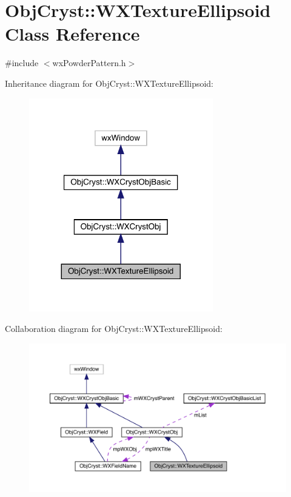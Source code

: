 \hypertarget{class_obj_cryst_1_1_w_x_texture_ellipsoid}{}\section{Obj\+Cryst\+::W\+X\+Texture\+Ellipsoid Class Reference}
\label{class_obj_cryst_1_1_w_x_texture_ellipsoid}


{\ttfamily \#include $<$wx\+Powder\+Pattern.\+h$>$}



Inheritance diagram for Obj\+Cryst\+::W\+X\+Texture\+Ellipsoid\+:
\nopagebreak
\begin{figure}[H]
\begin{center}
\leavevmode
\includegraphics[width=227pt]{class_obj_cryst_1_1_w_x_texture_ellipsoid__inherit__graph}
\end{center}
\end{figure}


Collaboration diagram for Obj\+Cryst\+::W\+X\+Texture\+Ellipsoid\+:
\nopagebreak
\begin{figure}[H]
\begin{center}
\leavevmode
\includegraphics[width=350pt]{class_obj_cryst_1_1_w_x_texture_ellipsoid__coll__graph}
\end{center}
\end{figure}
